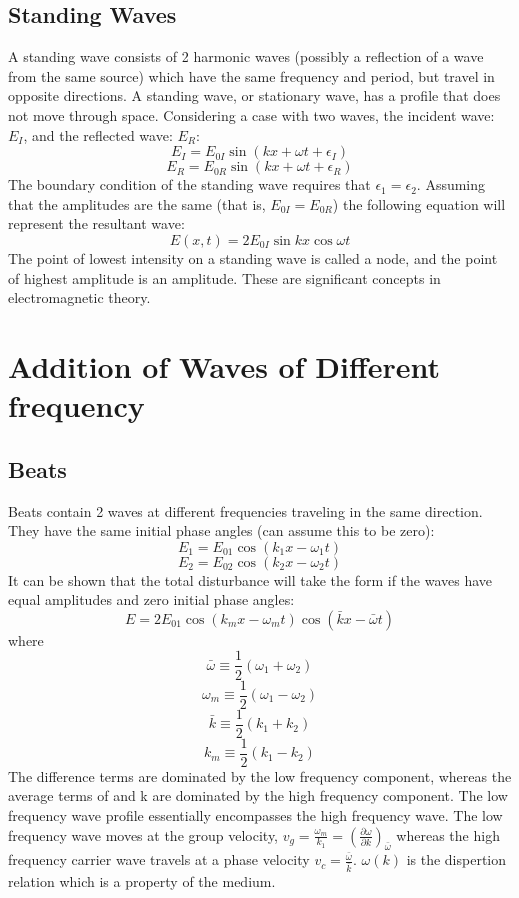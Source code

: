 \documentclass[12pt]{report}
\begin{document}
\subsection{Standing Waves}

A standing wave consists of 2 harmonic waves (possibly a reflection of a wave from the same source) which have the same frequency and period, but travel in opposite directions. A standing wave, or stationary wave, has a profile that does not move through space. Considering a case with two waves, the incident wave: $E_I$, and the reflected wave: $E_R$:
\[E_I = E_{0I} \sin (kx+\omega t+\epsilon_I)\]
\[E_R = E_{0R} \sin (kx+\omega t+\epsilon_R)\]
The boundary condition of the standing wave requires that $\epsilon_1 = \epsilon_2$. Assuming that the amplitudes are the same (that is, $E_{0I} = E_{0R}$) the following equation will represent the resultant wave:
\begin{equation}
E(x,t) = 2E_{0I} \sin kx \cos \omega t
\end{equation}
The point of lowest intensity on a standing wave is called a node, and the point of highest amplitude is an amplitude. These are significant concepts in electromagnetic theory. 

\section{Addition of Waves of Different frequency}
\subsection{Beats}

Beats contain 2 waves at different frequencies traveling in the same direction. They have the same initial phase angles (can assume this to be zero): 
\[E_1 = E_{01} \cos (k_1x - \omega _1 t)\]
\[E_2 = E_{02} \cos (k_2x - \omega _2 t)\]
It can be shown that the total disturbance will take the form if the waves have equal amplitudes and zero initial phase angles:
\begin{equation}
E = 2E_{01} \cos (k_mx-\omega_m t) \cos (\bar{k}x-\bar{\omega}t)
\end{equation}
where
\[\bar{\omega} \equiv \frac{1}{2}(\omega_1+\omega_2)\]
\[\omega_m \equiv \frac{1}{2}(\omega_1-\omega_2)\]
\[\bar{k} \equiv \frac{1}{2}(k_1+k_2)\]
\[k_m \equiv \frac{1}{2}(k_1-k_2)\]
The difference terms are dominated by the low frequency component, whereas the average terms of \textomega {}  and k are dominated by the high frequency component. The low frequency wave profile essentially encompasses the high frequency wave. The low frequency wave moves at the group velocity, $v_g = \frac{\omega_m}{k_1} = \left( \frac{\partial \omega }{\partial k} \right)_{\bar{\omega}}$ whereas the high frequency carrier wave travels at a phase velocity $v_c = \frac{\bar{\omega}}{\bar{k}}$. $\omega(k)$ is the dispertion relation which is a property of the medium. 
\end{document}
